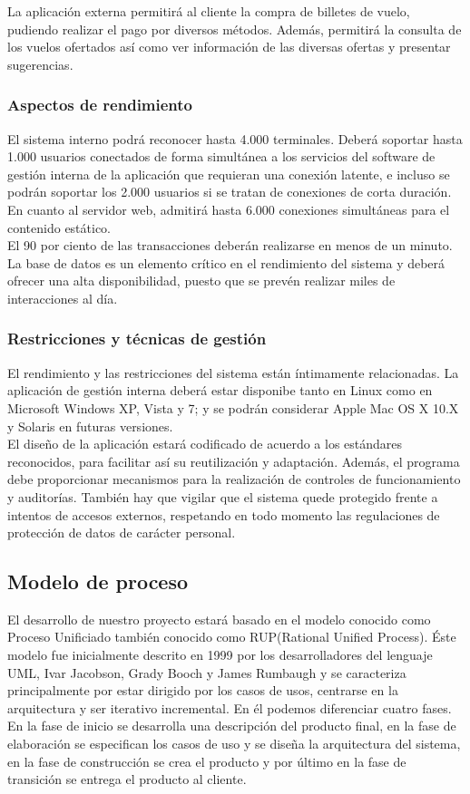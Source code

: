 \documentclass[11pt, a4paper, twoside]{report}
\begin{document}
			La aplicación externa permitirá al cliente la compra de billetes de vuelo, pudiendo realizar el pago por diversos métodos. Además, permitirá la consulta de los vuelos ofertados así como ver información de las diversas ofertas y presentar sugerencias.
			
			\subsubsection{Aspectos de rendimiento}
			El sistema interno podrá reconocer hasta 4.000 terminales. Deberá soportar hasta 1.000 usuarios conectados de forma simultánea a los servicios del software de gestión interna de la aplicación que requieran una conexión latente, e incluso se podrán soportar los 2.000 usuarios si se tratan de conexiones de corta duración.  En cuanto al servidor web, admitirá hasta 6.000 conexiones simultáneas para el contenido estático. \\
			El 90 por ciento de las transacciones deberán realizarse en menos de un minuto. La base de datos es un elemento crítico en el rendimiento del sistema y deberá ofrecer una alta disponibilidad, puesto que se prevén realizar miles de interacciones al día.

			\subsubsection{Restricciones y técnicas de gestión}
			El rendimiento y las restricciones del sistema están íntimamente relacionadas. La aplicación de gestión interna deberá estar disponibe tanto en Linux como en Microsoft Windows XP, Vista y 7; y se podrán considerar Apple Mac OS X 10.X y Solaris en futuras versiones.  \\
			El diseño de la aplicación estará codificado de acuerdo a los estándares reconocidos, para facilitar así su reutilización y adaptación. Además, el programa debe proporcionar mecanismos para la realización de controles de funcionamiento y auditorías. También hay que vigilar que el sistema quede protegido frente a intentos de accesos externos, respetando en todo momento las regulaciones de protección de datos de carácter personal.

		\subsection{Modelo de proceso}
		El desarrollo de nuestro proyecto estará basado en el modelo conocido como Proceso Unificiado también conocido como RUP(Rational Unified Process). Éste modelo fue inicialmente descrito en 1999 por los desarrolladores del lenguaje UML, Ivar Jacobson, Grady Booch y James Rumbaugh y se caracteriza principalmente por estar dirigido por los casos de usos, centrarse en la arquitectura y ser iterativo incremental. En él podemos diferenciar cuatro fases. En la fase de inicio se desarrolla una descripción del producto final, en la fase de elaboración se especifican los casos de uso y se diseña la arquitectura del sistema, en la fase de construcción se crea el producto y por último en la fase de transición se entrega el producto al cliente.
\end{document}
